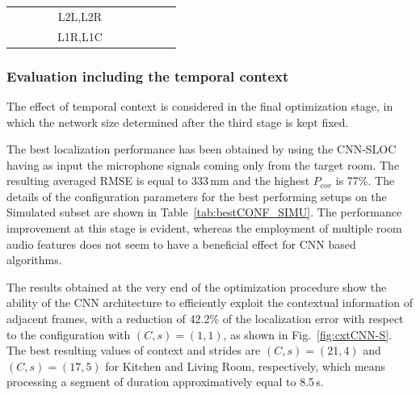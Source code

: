 \documentclass[review]{elsarticle}
\newcommand{\figref}[1]{Fig.~\ref{#1}}
\newcommand{\tableref}[1]{Table~\ref{#1}}
\begin{document}
\begin{table}[!h]
{\begin{tabular}{c|cc|cc|cc|cc|cc}
		&                                &                          &                                                                            & L2L,L2R               &                                         &                                             &                      &                      &                      &                     \\
		&                                &                          &                                                                            & L1R,L1C               &                                         &                                             &                      &                      &                      &                     \\
	\end{tabular}
	}
\end{table}



\subsubsection{Evaluation including the temporal context}
The effect of temporal context is considered in the final optimization stage, in which the network size determined after the third stage is kept fixed. %

The best localization performance has been obtained by using the CNN-SLOC having as input the microphone signals coming only from the target room. The resulting averaged RMSE is equal to 333\,mm and the highest $P_{cor}$ is 77\%. The details of the configuration parameters for the best performing setups on the Simulated subset are shown in \tableref{tab:bestCONF_SIMU}. The performance improvement at this stage is evident, whereas the employment of multiple room audio features does not seem to have a beneficial effect for CNN based algorithms. 

The results obtained at the very end of the optimization procedure show the ability of the CNN architecture to efficiently exploit the contextual information of adjacent frames, with a reduction of 42.2\% of the localization error with respect to the configuration with $(C,s)=(1,1)$, as shown in \figref{fig:cxtCNN-S}. 
The best resulting values of context and strides are $(C,s)=(21,4)$ and $(C,s)=(17,5)$ for Kitchen and Living Room, respectively, which means processing a segment of duration approximatively equal to 8.5\,s.
\end{document}
